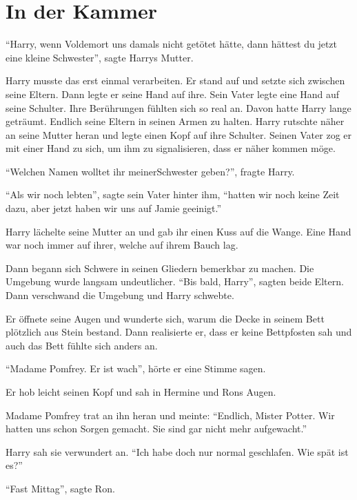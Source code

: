 \chapter{In der Kammer}

\begin{traum}
\enquote{Harry, wenn Voldemort uns damals nicht getötet hätte, \gst dann hättest du jetzt eine kleine Schwester}, sagte Harrys Mutter.

Harry musste das erst einmal verarbeiten. Er stand auf und setzte sich zwischen seine Eltern. Dann legte er seine Hand auf ihre. Sein Vater legte eine Hand auf seine Schulter. Ihre Berührungen fühlten sich so real an. Davon hatte Harry lange geträumt. Endlich seine Eltern in seinen Armen zu halten. Harry rutschte näher an seine Mutter heran und legte einen Kopf auf ihre Schulter. Seinen Vater zog er mit einer Hand zu sich, um ihm zu signalisieren, dass er näher kommen möge.

\enquote{Welchen Namen wolltet ihr meiner\abs Schwester geben?}, fragte Harry.

\enquote{Als wir noch lebten}, sagte sein Vater hinter ihm, \enquote{hatten wir noch keine Zeit dazu, aber jetzt haben wir uns auf Jamie geeinigt.}

Harry lächelte seine Mutter an und gab ihr einen Kuss auf die Wange. Eine Hand war noch immer auf ihrer, welche auf ihrem Bauch lag.

Dann begann sich Schwere in seinen Gliedern bemerkbar zu machen. Die Umgebung wurde langsam undeutlicher. \enquote{Bis bald, Harry}, sagten beide Eltern. Dann verschwand die Umgebung und Harry schwebte.
\end{traum}

Er öffnete seine Augen und wunderte sich, warum die Decke in seinem Bett plötzlich aus Stein bestand. Dann realisierte er, dass er keine Bettpfosten sah und auch das Bett fühlte sich anders an.

\enquote{Madame Pomfrey. Er ist wach}, hörte er eine Stimme sagen.

 Er hob leicht seinen Kopf und sah in Hermine und Rons Augen.

Madame Pomfrey trat an ihn heran und meinte: \enquote{Endlich, Mister Potter. Wir hatten uns schon Sorgen gemacht. Sie sind gar nicht mehr aufgewacht.}

Harry sah sie verwundert an. \enquote{Ich habe doch nur normal geschlafen. Wie spät ist es?}

\enquote{Fast Mittag}, sagte Ron.

